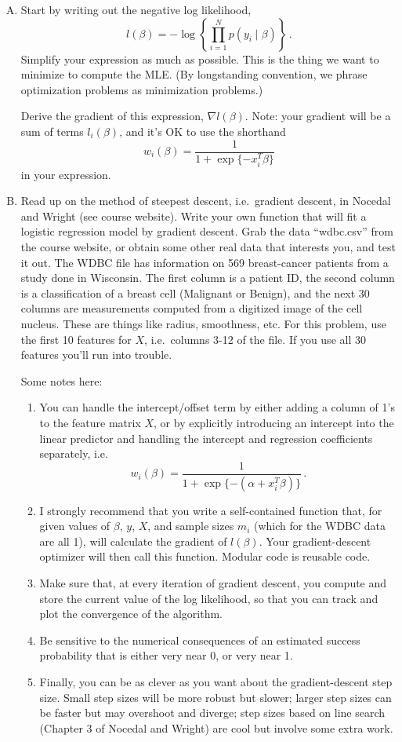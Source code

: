 \documentclass{mynotes}
\begin{document}
\begin{enumerate}[(A)]
\item Start by writing out the negative log likelihood,
$$
l(\beta) = - \log \left \{ \prod_{i=1}^N p(y_i \mid \beta) \right \} \, .
$$
Simplify your expression as much as possible. This is the thing we want to
minimize to compute the MLE. (By longstanding convention, we phrase optimization
problems as minimization problems.)

Derive the gradient of this expression, $\nabla l(\beta)$. Note: your gradient
will be a sum of terms $l_i(\beta)$, and it's OK to use the shorthand
$$
w_i(\beta) = \frac{1}{1 + \exp\{-x_i^T \beta\}}
$$
in your expression.


\item Read up on the method of steepest descent, i.e.~gradient descent, in
Nocedal and Wright (see course website). Write your own function that will fit a
logistic regression model by gradient descent. Grab the data ``wdbc.csv'' from
the course website, or obtain some other real data that interests you, and test
it out. The WDBC file has information on 569 breast-cancer patients from a study
done in Wisconsin. The first column is a patient ID, the second column is a
classification of a breast cell (Malignant or Benign), and the next 30 columns
are measurements computed from a digitized image of the cell nucleus. These are
things like radius, smoothness, etc. For this problem, use the first 10 features
for $X$, i.e.~columns 3-12 of the file. If you use all 30 features you'll run
into trouble.

Some notes here:
\begin{enumerate}[1.]
\item You can handle the intercept/offset term by either adding a column of 1's
to the feature matrix $X$, or by explicitly introducing an intercept into the
linear predictor and handling the intercept and regression coefficients
separately, i.e.
$$
w_i(\beta) = \frac{1}{1 + \exp\{-(\alpha + x_i^T \beta )\}} \, .
$$
\item I strongly recommend that you write a self-contained function that, for
given values of $\beta$, $y$, $X$, and sample sizes $m_i$ (which for the WDBC
data are all 1), will calculate the gradient of $l(\beta)$. Your
gradient-descent optimizer will then call this function. Modular code is
reusable code.
\item Make sure that, at every iteration of gradient descent, you compute and
store the current value of the log likelihood, so that you can track and plot
the convergence of the algorithm.
\item Be sensitive to the numerical consequences of an estimated success
probability that is either very near 0, or very near 1.
\item Finally, you can be as clever as you want about the gradient-descent step
size. Small step sizes will be more robust but slower; larger step sizes can be
faster but may overshoot and diverge; step sizes based on line search (Chapter 3
of Nocedal and Wright) are cool but involve some extra work.
\end{enumerate}



\end{enumerate}
\end{document}
